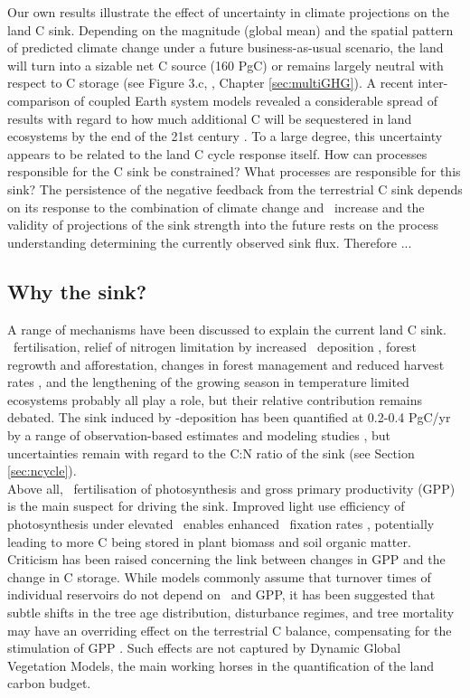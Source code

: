 Our own results illustrate the effect of uncertainty in climate projections on the land C sink. Depending on the magnitude (global mean) and the spatial pattern of predicted climate change under a future business-as-usual scenario, the land will turn into a sizable net C source (160 PgC) or remains largely neutral with respect to C storage (see Figure 3.c, \citet{stocker13natcc}, Chapter \ref{sec:multiGHG}). A recent inter-comparison of coupled Earth system models revealed a considerable spread of results with regard to how much additional C will be sequestered in land ecosystems by the end of the 21st century \citep{arora13}. To a large degree, this uncertainty appears to be related to the land C cycle response itself. How can processes responsible for the C sink be constrained? What processes are responsible for this sink? The persistence of the negative feedback from the terrestrial C sink depends on its response to the combination of climate change and \coo\ increase and the validity of projections of the sink strength into the future rests on the process understanding determining the currently observed sink flux. Therefore ...

\subsection{Why the sink?}
\label{sec:sink}
A range of mechanisms have been discussed to explain the current land C sink. \coo\ fertilisation, relief of nitrogen limitation by increased \nr\ deposition \citep{norby98, thornton07, zaehledalmonech11, thomas10}, forest regrowth and afforestation, changes in forest management and reduced harvest rates \citep{nabuurs13}, and the lengthening of the growing season in temperature limited ecosystems probably all play a role, but their relative contribution remains debated. The sink induced by \nr -deposition has been quantified at 0.2-0.4 PgC/yr by a range of observation-based estimates and modeling studies \citep{nadelhoffer99, liugreaver09, thomas10, zaehledalmonech11}, but uncertainties remain with regard to the C:N ratio of the sink (see Section \ref{sec:ncycle}). \\

Above all, \coo\ fertilisation of photosynthesis and gross primary productivity (GPP) is the main suspect for driving the sink. Improved light use efficiency of photosynthesis under elevated \coo\ enables enhanced \coo\ fixation rates \citep{haxeltine96}, potentially leading to more C being stored in plant biomass and soil organic matter. Criticism has been raised concerning the link between changes in GPP and the change in C storage. While models commonly assume that turnover times of individual reservoirs do not depend on \coo\ and GPP, it has been suggested that subtle shifts in the tree age distribution, disturbance regimes, and tree mortality may have an overriding effect on the terrestrial C balance, compensating for the stimulation of GPP \citep{koerner09}. Such effects are not captured by Dynamic Global Vegetation Models, the main working horses in the quantification of the land carbon budget.\\

